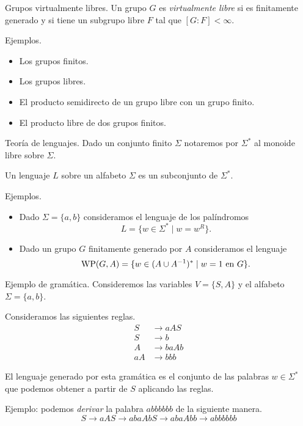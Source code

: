 \documentclass[aspectratio=169, 11pt]{beamer}
\begin{document}
	\begin{frame}[fragile]{Grupos virtualmente libres.}
		Un grupo $G$ es \emph{virtualmente libre} si es finitamente generado y si
		tiene un subgrupo libre $F$ tal que $[G:F] < \infty$.

		\begin{alertblock}{Ejemplos.}
			\begin{itemize}
				\item Los grupos finitos.
				\item Los grupos libres.
				\item El producto semidirecto de un grupo libre con un grupo finito.
				\item El producto libre de dos grupos finitos.
			\end{itemize}
		\end{alertblock}
	\end{frame}

	\begin{frame}[fragile]{Teoría de lenguajes.}
		Dado un conjunto finito $\Sigma$ notaremos por $\Sigma^*$ al monoide libre sobre $\Sigma$.
		
		
			Un lenguaje $L$ sobre un alfabeto $\Sigma$ es un subconjunto de $\Sigma^*$.
			
		
		\begin{alertblock}{Ejemplos.}
			\begin{itemize}
				\item 
					Dado $\Sigma = \{a,b\}$ consideramos el lenguaje de los palíndromos
					\[
						L = \{ w \in \Sigma^{*} \mid w = w^{R}  \}.
					\]
				\item 
					Dado un grupo $G$ finitamente generado por $A$ consideramos el lenguaje
					\[
						\text{WP}(G, A) = \{ w \in (A \cup A^{-1})^{*} \mid w = 1 \ \text{en $G$} \}.	
					\]
			\end{itemize}
		\end{alertblock}
	\end{frame}
	
	\begin{frame}[fragile]{Ejemplo de gramática.}
		Consideremos las variables $V =\{ S,A \}$ y el alfabeto $\Sigma = \{ a,b \}$.

		Consideramos las siguientes reglas.
		\begin{align*}
			S  & \to aAS  \\
			S  & \to b    \\
			A  & \to baAb \\
			aA & \to bbb
		\end{align*}

		El lenguaje generado por esta gramática es el conjunto de las palabras $w \in \Sigma^{*}$ que podemos obtener a partir de $S$ aplicando las reglas.

		Ejemplo: podemos \emph{derivar} la palabra $abbbbbb$ de la siguiente manera.  
		\[
			S \to aAS \to abaAbS \to abaAbb \to abbbbbb	
		\]
	\end{frame}
\end{document}
